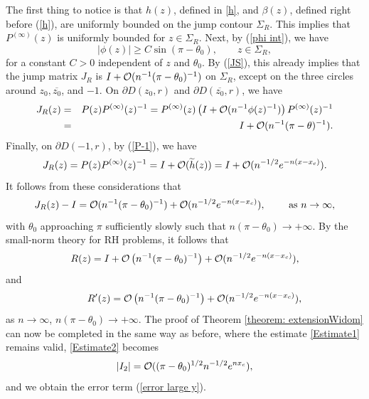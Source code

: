 \documentclass[11pt,fleqn]{article}
\numberwithin{equation}{section}
\def\bigO{{\cal O}}
\begin{document}
The first thing to notice is that  $h(z)$, defined in \eqref{h}, and $\beta(z)$, defined right before (\ref{h}), are uniformly bounded on the jump contour $\Sigma_{R}$. This implies that $P^{(\infty)}(z)$ is uniformly bounded for $z\in\Sigma_R$. 
Next, by (\ref{phi int}), we have \begin{equation}|\phi(z)| \geq C \sin(\pi-\theta_{0}),\qquad z\in\Sigma_R,
\end{equation} 
for a constant $C > 0$ independent of $z$ and $\theta_{0}$. 
By (\ref{JS}), this already implies that the jump matrix $J_R$ is $I+\bigO(n^{-1}(\pi-\theta_0)^{-1})$ on $\Sigma_R$, except on the three circles around $z_0, \overline{z_0}$, and $-1$.
On $\partial D(z_0,r)$ and $\partial D(\overline{z_0},r)$, we have
\begin{eqnarray}
J_R(z)&=&P(z)P^{(\infty)}(z)^{-1}=P^{(\infty)}(z)\left(I+\bigO(n^{-1}\phi(z)^{-1})\right)P^{(\infty)}(z)^{-1}\\&=&I+\bigO(n^{-1}(\pi-\theta)^{-1}).
\end{eqnarray}
Finally, on $\partial D(-1,r)$, by (\ref{P-1}), we have
\begin{equation}
J_R(z)=P(z)P^{(\infty)}(z)^{-1}=I+\bigO(\widetilde{h}(z))=I+\bigO(n^{-1/2}e^{-n(x-x_c)}).
\end{equation}
It follows from these considerations that \[J_{R}(z) - I = \bigO(n^{-1}(\pi-\theta_0)^{-1}) + \bigO(n^{-1/2}e^{-n(x-x_c)}),\qquad\mbox{ as $n\to\infty$},\] with $\theta_0$ approaching $\pi$ sufficiently slowly such that $n (\pi-\theta_{0}) \to + \infty$. By the small-norm theory for RH problems, it follows that \begin{equation}
R(z) = I+\bigO \left( n^{-1}(\pi-\theta_{0})^{-1}\right) + \bigO(n^{-1/2}e^{-n(x-x_c)}),
\end{equation} and \begin{equation}
\qquad R^{\prime}(z) = \bigO \left( n^{-1}(\pi-\theta_{0})^{-1}\right) + \bigO(n^{-1/2}e^{-n(x-x_c)}),
\end{equation}
as $n\to\infty$, $n (\pi-\theta_{0}) \to + \infty$.
The proof of Theorem \ref{theorem: extensionWidom} can now be completed in the same way as before, where the estimate \eqref{Estimate1} remains valid, \eqref{Estimate2} becomes
\begin{equation*}
|I_{2}| =\bigO((\pi-\theta_0)^{1/2}n^{-1/2}e^{nx_c}),
\end{equation*}
and we obtain the error term (\ref{error large y}).



\end{document}
